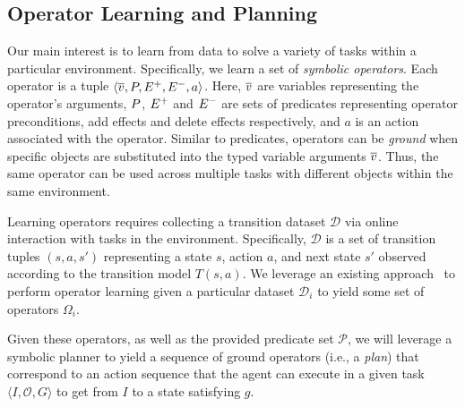 \subsection{Operator Learning and Planning}
\label{subsec:op-learning}
Our main interest is to learn from data to solve a variety of tasks within a particular environment.
Specifically, we learn a set of \textit{symbolic operators}.
Each operator is a tuple $\langle \overline{v}, P, E^+, E^-, a \rangle$. 
Here, $\overline{v}$ are variables representing the operator's arguments, $P$, $E^+$ and $E^-$ are sets of predicates representing operator preconditions, add effects and delete effects respectively, and $a$ is an action associated with the operator. 
Similar to predicates, operators can be \textit{ground} when specific objects are substituted into the typed variable arguments $\overline{v}$.
Thus, the same operator can be used across multiple tasks with different objects within the same environment.

Learning operators requires collecting a transition dataset $\mathcal{D}$ via online interaction with tasks in the environment.
Specifically, $\mathcal{D}$ is a set of transition tuples $(s, a, s')$ representing a state $s$, action $a$, and next state $s'$ observed according to the transition model $T(s, a)$.
We leverage an existing approach~\citep{zpk} to perform operator learning given a particular dataset $\mathcal{D}_i$ to yield some set of operators $\Omega_{i}$. 

Given these operators, as well as the provided predicate set $\mathcal{P}$, we will leverage a symbolic planner to yield a sequence of ground operators (i.e., a \textit{plan}) that correspond to an action sequence that the agent can execute in a given task $\langle I, \mathcal{O}, G \rangle$ to get from $I$ to a state satisfying $g$.

